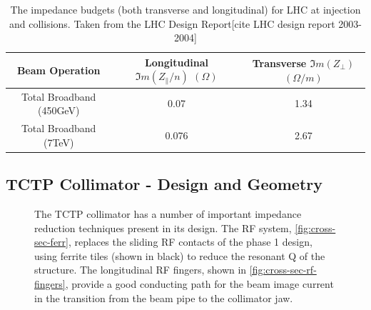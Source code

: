 \begin{table}
\caption{The impedance budgets (both transverse and longitudinal) for LHC at injection and collisions. Taken from the LHC Design Report[cite LHC design report 2003-2004]}
\begin{center}
\begin{tabular}{c | c | c}
Beam Operation & Longitudinal $\Im{}m ( Z_{\parallel}/n )$ $( \Omega )$ & Transverse $\Im{}m ( Z_{\perp} )$ $( \Omega /m )$\\ \hline
Total Broadband (450GeV) & 0.07 & 1.34 \\ \hline
Total Broadband (7TeV) & 0.076 & 2.67 \\ \hline
\end{tabular}
\end{center}
\label{tab:lhc-impedance-budget}
\end{table}

\subsection{TCTP Collimator - Design and Geometry}

\begin{figure}
\label{fig:tctp-figure}
\caption{The TCTP collimator has a number of important impedance reduction techniques present in its design. The RF system, \ref{fig:cross-sec-ferr}, replaces the sliding RF contacts of the phase 1 design, using ferrite tiles (shown in black) to reduce the resonant Q of the structure. The longitudinal RF fingers, shown in \ref{fig:cross-sec-rf-fingers}, provide a good conducting path for the beam image current in the transition from the beam pipe to the collimator jaw.}
\end{figure}

